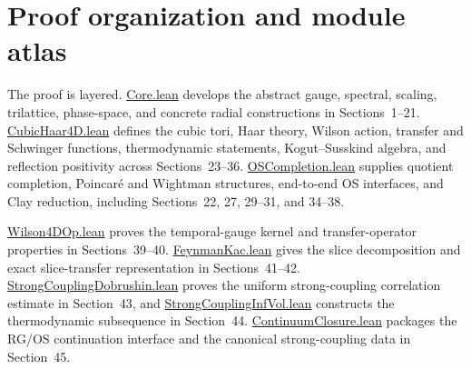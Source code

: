 \documentclass[11pt]{article}
\numberwithin{equation}{section}
\newcommand{\Lean}[1]{\url{#1}}
\begin{document}
\section{Proof organization and module atlas}

The proof is layered. \Lean{Core.lean} develops the abstract gauge, spectral, scaling, trilattice, phase-space, and concrete radial constructions in Sections~1--21. \Lean{CubicHaar4D.lean} defines the cubic tori, Haar theory, Wilson action, transfer and Schwinger functions, thermodynamic statements, Kogut--Susskind algebra, and reflection positivity across Sections~23--36. \Lean{OSCompletion.lean} supplies quotient completion, Poincar\'e and Wightman structures, end-to-end OS interfaces, and Clay reduction, including Sections~22, 27, 29--31, and 34--38.

\Lean{Wilson4DOp.lean} proves the temporal-gauge kernel and transfer-operator properties in Sections~39--40. \Lean{FeynmanKac.lean} gives the slice decomposition and exact slice-transfer representation in Sections~41--42. \Lean{StrongCouplingDobrushin.lean} proves the uniform strong-coupling correlation estimate in Section~43, and \Lean{StrongCouplingInfVol.lean} constructs the thermodynamic subsequence in Section~44. \Lean{ContinuumClosure.lean} packages the RG/OS continuation interface and the canonical strong-coupling data in Section~45.
\end{document}
